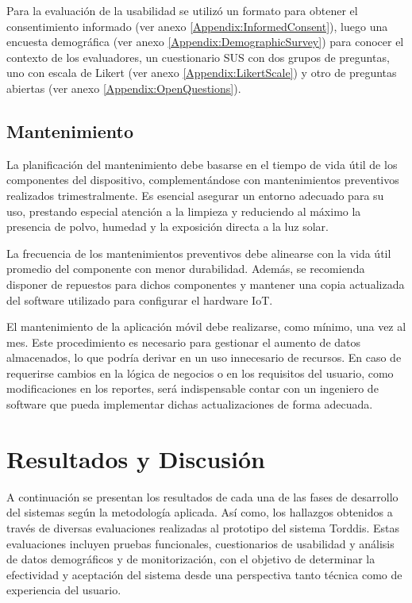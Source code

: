 \documentclass[a4paper,fleqn]{cas-sc}
\begin{document}
			Para la evaluación de la usabilidad se utilizó un formato para obtener el consentimiento informado (ver anexo \ref{Appendix:InformedConsent}), luego una encuesta demográfica (ver anexo \ref{Appendix:DemographicSurvey}) para conocer el contexto de los evaluadores, un cuestionario SUS con dos grupos de preguntas, uno con escala de Likert (ver anexo \ref{Appendix:LikertScale}) y otro de preguntas abiertas (ver anexo \ref{Appendix:OpenQuestions}).
						
		\subsection{Mantenimiento}		
			La planificación del mantenimiento debe basarse en el tiempo de vida útil de los componentes del dispositivo, complementándose con mantenimientos preventivos realizados trimestralmente. Es esencial asegurar un entorno adecuado para su uso, prestando especial atención a la limpieza y reduciendo al máximo la presencia de polvo, humedad y la exposición directa a la luz solar.
			
			La frecuencia de los mantenimientos preventivos debe alinearse con la vida útil promedio del componente con menor durabilidad. Además, se recomienda disponer de repuestos para dichos componentes y mantener una copia actualizada del software utilizado para configurar el hardware IoT.
			
			El mantenimiento de la aplicación móvil debe realizarse, como mínimo, una vez al mes. Este procedimiento es necesario para gestionar el aumento de datos almacenados, lo que podría derivar en un uso innecesario de recursos. En caso de requerirse cambios en la lógica de negocios o en los requisitos del usuario, como modificaciones en los reportes, será indispensable contar con un ingeniero de software que pueda implementar dichas actualizaciones de forma adecuada.
		
	\section{Resultados y Discusión}
	\label{seccion:Cinco}
		A continuación se presentan los resultados de cada una de las fases de desarrollo del sistemas según la metodología aplicada. Así como, los hallazgos obtenidos a través de diversas evaluaciones realizadas al prototipo del sistema Torddis. Estas evaluaciones incluyen pruebas funcionales, cuestionarios de usabilidad y análisis de datos demográficos y de monitorización, con el objetivo de determinar la efectividad y aceptación del sistema desde una perspectiva tanto técnica como de experiencia del usuario.
		
\end{document}
